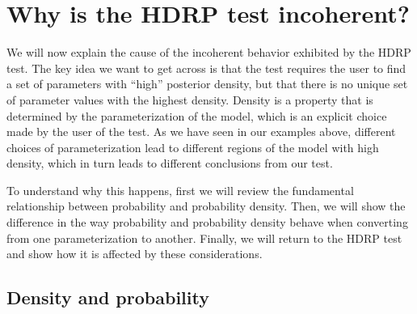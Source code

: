 \documentclass[man]{apa}
\newcommand{\hdr}{HDRP}
\begin{document}


 


\section*{Why is the \hdr{} test incoherent?}

We will now explain the cause of the incoherent behavior exhibited by the \hdr{} test. The key idea we want to get across is that the test requires the user to find a set of parameters with ``high'' posterior density, but that there is no unique set of parameter values with the highest density. Density is a property that is determined by the parameterization of the model, which is an explicit choice made by the user of the test. As we have seen in our examples above, different choices of parameterization lead to different regions of the model with high density, which in turn leads to different conclusions from our test.

To understand why this happens, first we will review the fundamental relationship between probability and probability density. Then, we will show the difference in the way probability and probability density behave when converting from one parameterization to another. Finally, we will return to the \hdr{} test and show how it is affected by these considerations.  
    
   \subsection*{Density and probability}
\end{document}
